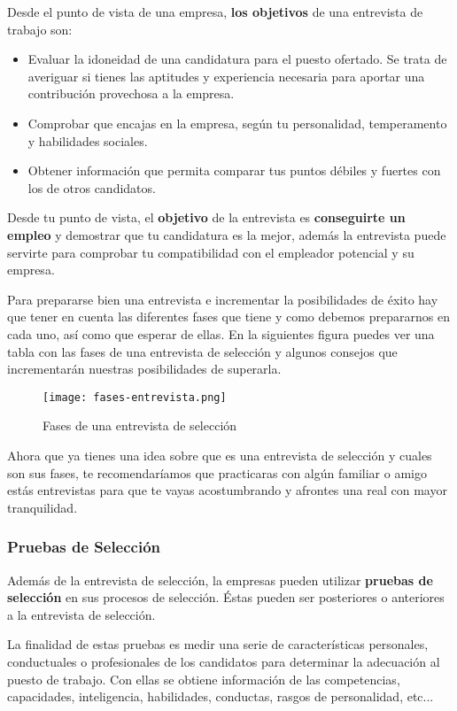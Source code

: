 Desde el punto de vista de una empresa, \textbf{los objetivos} de una entrevista de trabajo son:

\begin{itemize}
    \item Evaluar la idoneidad de una candidatura para el puesto ofertado. Se trata de averiguar si tienes las aptitudes y experiencia necesaria para aportar una contribución provechosa a la empresa.
    \item Comprobar que encajas en la empresa, según tu personalidad, temperamento y habilidades sociales.
    \item Obtener información que permita comparar tus puntos débiles y fuertes con los de otros candidatos.
\end{itemize}

Desde tu punto de vista, el \textbf{objetivo} de la entrevista es \textbf{conseguirte un empleo} y demostrar que tu candidatura es la mejor, además la entrevista puede servirte para comprobar tu compatibilidad con el empleador potencial y su empresa.

Para prepararse bien una entrevista e incrementar la posibilidades de éxito hay que tener en cuenta las diferentes fases que tiene y como debemos prepararnos en cada uno, así como que esperar de ellas. En la siguientes figura puedes ver una tabla con las fases de una entrevista de selección y algunos consejos que incrementarán nuestras posibilidades de superarla.

\begin{figure}[ht]
    \centering
    \texttt{[image: fases-entrevista.png]}
    \caption{Fases de una entrevista de selección}
\end{figure}

Ahora que ya tienes una idea sobre que es una entrevista de selección y cuales son sus fases, te recomendaríamos que practicaras con algún familiar o amigo estás entrevistas para que te vayas acostumbrando y afrontes una real con mayor tranquilidad.

\subsubsection{Pruebas de Selección}
Además de la entrevista de selección, la empresas pueden utilizar \textbf{pruebas de selección} en sus procesos de selección. Éstas pueden ser posteriores o anteriores a la entrevista de selección.

La finalidad de estas pruebas es medir una serie de características personales, conductuales o profesionales de los candidatos para determinar la adecuación al puesto de trabajo. Con ellas se obtiene información de las competencias, capacidades, inteligencia, habilidades, conductas, rasgos de personalidad, etc...

